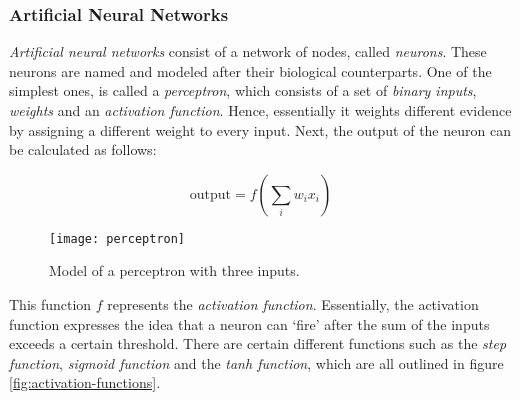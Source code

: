 \subsubsection{Artificial Neural Networks}

\textit{Artificial neural networks} consist of a network of nodes, called \textit{neurons}.
These neurons are named and modeled after their biological counterparts.
One of the simplest ones, is called a \textit{perceptron}, which consists of a set of \textit{binary inputs}, \textit{weights} and an \textit{activation function}.
Hence, essentially it weights different evidence by assigning a different weight to every input.
Next, the output of the neuron can be calculated as follows:

$$\text{output} = f(\sum_{i} w_i x_i)$$

\newpage

\begin{figure}[ht]
  \centering
  \texttt{[image: perceptron]}
  \caption{Model of a perceptron with three inputs.}
  \label{fig:perceptron}
\end{figure}

This function $f$ represents the \textit{activation function}.
Essentially, the activation function expresses the idea that a neuron can `fire' after the sum of the inputs exceeds a certain threshold.
There are certain different functions such as the \textit{step function}, \textit{sigmoid function} and the \textit{tanh function},
which are all outlined in figure \ref{fig:activation-functions}.

